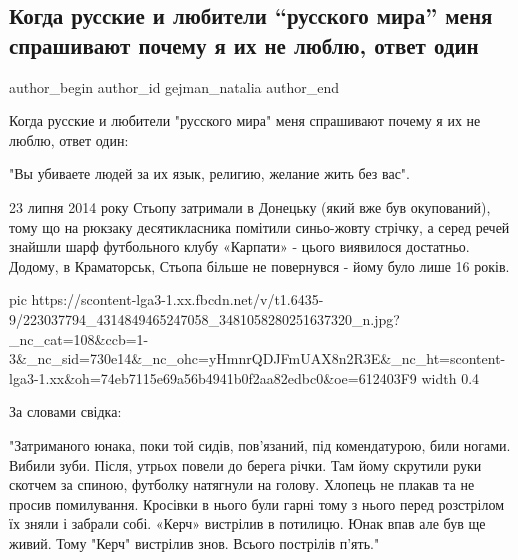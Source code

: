  
 
 
 
 
 
\subsection{Когда русские и любители \enquote{русского мира} меня спрашивают почему я их не люблю, ответ один}
\label{sec:26_07_2021.fb.gejman_natalia.1.rusmir}
 
\ifcmt
 author_begin
   author_id gejman_natalia
 author_end
\fi

Когда русские и любители "русского мира" меня спрашивают почему я их не люблю,
ответ один: 

"Вы убиваете людей за их язык, религию, желание жить без вас". 

23 липня 2014 року Стьопу затримали в Донецьку (який вже був окупований), тому
що на рюкзаку десятикласника помітили синьо-жовту стрічку, а серед речей
знайшли шарф футбольного клубу «Карпати» - цього виявилося достатньо. Додому, в
Краматорськ, Стьопа більше не повернувся - йому було лише 16 років.

\ifcmt
  pic https://scontent-lga3-1.xx.fbcdn.net/v/t1.6435-9/223037794_4314849465247058_3481058280251637320_n.jpg?_nc_cat=108&ccb=1-3&_nc_sid=730e14&_nc_ohc=yHmnrQDJFmUAX8n2R3E&_nc_ht=scontent-lga3-1.xx&oh=74eb7115e69a56b4941b0f2aa82edbc0&oe=612403F9
  width 0.4
\fi

За словами свідка:

"Затриманого юнака, поки той сидів, пов'язаний, під комендатурою, били ногами.
Вибили зуби. Після, утрьох повели до берега річки. Там йому скрутили руки
скотчем за спиною, футболку натягнули на голову. Хлопець не плакав та не просив
помилування. Кросівки в нього були гарні тому з нього перед розстрілом їх зняли
і забрали собі. «Керч» вистрілив в потилицю. Юнак впав але був ще живий. Тому
"Керч" вистрілив знов. Всього пострілів п'ять."


